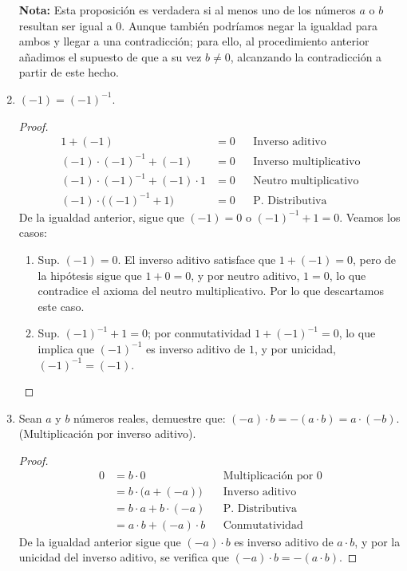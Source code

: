 \documentclass[11pt]{article}
\begin{document}
\begin{enumerate}[label=\alph*)]
    \textbf{Nota:} Esta proposición es verdadera si al menos uno de los números $a$ o $b$ resultan ser igual a $0$. Aunque también podríamos negar la igualdad para ambos y llegar a una contradicción; para ello, al procedimiento anterior añadimos el supuesto de que a su vez $b\neq0$, alcanzando la contradicción a partir de este hecho.

    \item $(-1)=(-1)^{-1}$.
    
    \vspace{-1em}\begin{proof} 
        \begin{align*}
            1 + (-1) &= 0 && \text{Inverso aditivo}\\
            (-1)\cdot (-1)^{-1} + (-1) &= 0 && \text{Inverso multiplicativo}\\
            (-1)\cdot (-1)^{-1} + (-1) \cdot 1 &= 0 && \text{Neutro multiplicativo}\\
            (-1) \cdot \bigl((-1)^{-1} + 1\bigr) &= 0 && \text{P. Distributiva}
        \end{align*} De la igualdad anterior, sigue que $(-1)=0$ o $(-1)^{-1} + 1=0$. Veamos los casos: \begin{enumerate}[label=\roman*)]
            \item Sup. $(-1)=0$. El inverso aditivo satisface que $1+(-1)=0$, pero de la hipótesis sigue que $1+0=0$, y por neutro aditivo, $1=0$, lo que contradice el axioma del neutro multiplicativo. Por lo que descartamos este caso.
            \item Sup. $(-1)^{-1} + 1=0$; por conmutatividad $1+(-1)^{-1}=0$, lo que implica que $(-1)^{-1}$ es inverso aditivo de $1$, y por unicidad, $(-1)^{-1}=(-1)$. \qedhere
        \end{enumerate}
    \end{proof} \vspace{-1em}

    \item Sean $a$ y $b$ números reales, demuestre que: $ (-a) \cdot b = -(a \cdot b) = a \cdot (-b)$. (Multiplicación por inverso aditivo).%
    
    \vspace{-1em}\begin{proof} 
        \begin{align*}
            0 &= b\cdot 0 && \text{Multiplicación por $0$}\\
            &= b \cdot \bigl(a+(-a)\bigr) && \text{Inverso aditivo}\\
            &= b\cdot a + b\cdot (-a) && \text{P. Distributiva}\\
            &= a\cdot b + (-a) \cdot b && \text{Conmutatividad}
        \end{align*} De la igualdad anterior sigue que $(-a)\cdot b$ es inverso aditivo de $a\cdot b$, y por la unicidad del inverso aditivo, se verifica que $(-a)\cdot b = -(a\cdot b)$.
        

\end{proof}
\end{enumerate}
\end{document}
